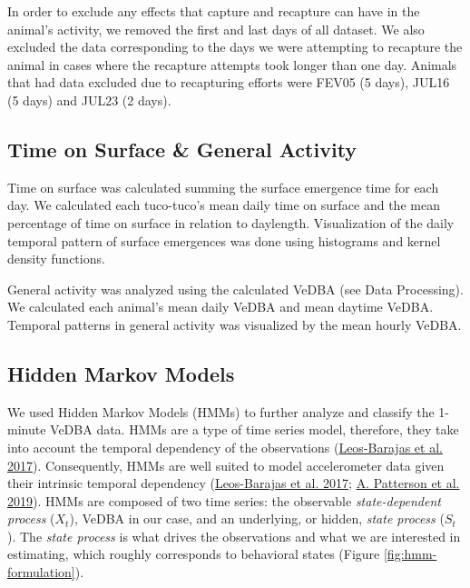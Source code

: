 \documentclass[english,msc,numbers,hidelinks]{coppe}
\begin{document}
  In order to exclude any effects that capture and recapture can have in the animal's activity, we removed the first and last days of all dataset. We also excluded the data corresponding to the days we were attempting to recapture the animal in cases where the recapture attempts took longer than one day. Animals that had data excluded due to recapturing efforts were FEV05 (5 days), JUL16 (5 days) and JUL23 (2 days).

  \hypertarget{time-on-surface-general-activity}{%
  \subsection{Time on Surface \& General Activity}\label{time-on-surface-general-activity}}

  Time on surface was calculated summing the surface emergence time for each day. We calculated each tuco-tuco's mean daily time on surface and the mean percentage of time on surface in relation to daylength. Visualization of the daily temporal pattern of surface emergences was done using histograms and kernel density functions.

  General activity was analyzed using the calculated VeDBA (see Data Processing). We calculated each animal's mean daily VeDBA and mean daytime VeDBA. Temporal patterns in general activity was visualized by the mean hourly VeDBA.

  \hypertarget{hidden-markov-models}{%
  \subsection{Hidden Markov Models}\label{hidden-markov-models}}

  We used Hidden Markov Models (HMMs) to further analyze and classify the 1-minute VeDBA data. HMMs are a type of time series model, therefore, they take into account the temporal dependency of the observations (\protect\hyperlink{ref-leosbarajas2017}{Leos-Barajas et al. 2017}). Consequently, HMMs are well suited to model accelerometer data given their intrinsic temporal dependency (\protect\hyperlink{ref-leosbarajas2017}{Leos-Barajas et al. 2017}; \protect\hyperlink{ref-patterson2019}{A. Patterson et al. 2019}). HMMs are composed of two time series: the observable \emph{state-dependent process} (\(X_t\)), VeDBA in our case, and an underlying, or hidden, \emph{state process} (\(S_t\)). The \emph{state process} is what drives the observations and what we are interested in estimating, which roughly corresponds to behavioral states (Figure \ref{fig:hmm-formulation}).
\end{document}
